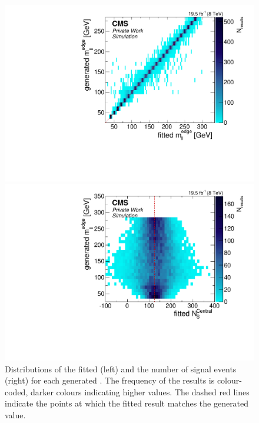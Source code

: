\begin{figure}[!hbp]
  \centering
  \begin{minipage}[t]{0.49\textwidth}
    \includegraphics[width=\textwidth]{plots/results/fit/toyResults/generatedM0vsfittedM0_signalInjectedN125.pdf}
  \end{minipage}
  \begin{minipage}[t]{0.49\textwidth}
    \includegraphics[width=\textwidth]{plots/results/fit/toyResults/generatedM0vsfittedNS_signalInjectedN125.pdf}
  \end{minipage}
  \caption{Distributions of the fitted \mlledge (left) and the number of signal events (right) for each generated \mlledge. The frequency of the results is colour-coded, darker colours indicating higher values. The dashed red lines indicate the points at which the fitted result matches the generated value.}
    \label{fig:toys:scan}
\end{figure}

